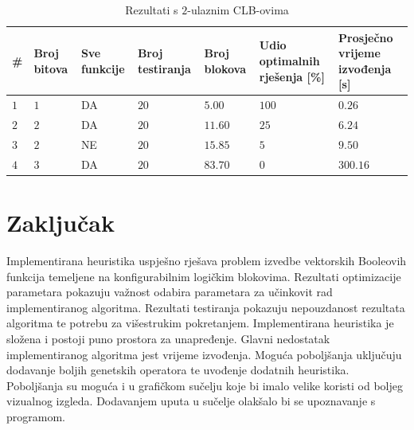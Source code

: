 \documentclass[times, utf8, diplomski]{fer}
\begin{document}
\begin{table}
	\centering
	\caption{Rezultati s $2$-ulaznim CLB-ovima}
	\label{tab:input-results}
	\begin{tabular}{
			|>{\centering\arraybackslash}m{4mm}
			|>{\centering\arraybackslash}m{18mm}
			|>{\centering\arraybackslash}m{18mm}
			|>{\centering\arraybackslash}m{18mm}
			|>{\centering\arraybackslash}m{18mm}
			|>{\centering\arraybackslash}m{20mm}
			|>{\centering\arraybackslash}m{20mm}|}
		\hline
		\textbf{\#}
		& \textbf{Broj \linebreak bitova}
		& \textbf{Sve \linebreak funkcije}
		& \textbf{Broj \linebreak testiranja}
		& \textbf{Broj \linebreak blokova}
		& \textbf{Udio \linebreak optimalnih \linebreak rješenja [\%]}
		& \textbf{Prosječno vrijeme izvođenja [s]} \\ \hline

		$1$		& $1$	& DA	& $20$		& $5.00$	& $100$		& $0.26$	\\ \hline
		$2$		& $2$	& DA	& $20$		& $11.60$	& $25$		& $6.24$	\\ \hline
		$3$		& $2$	& NE	& $20$		& $15.85$	& $5$		& $9.50$	\\ \hline
		$4$		& $3$	& DA	& $20$		& $83.70$	& $0$		& $300.16$	\\ \hline
		
	\end{tabular}
\end{table}


\chapter{Zaključak} \label{chapter:conclusion}

Implementirana heuristika uspješno rješava problem izvedbe vektorskih Booleovih funkcija temeljene na konfigurabilnim logičkim blokovima. Rezultati optimizacije parametara pokazuju važnost odabira parametara za učinkovit rad implementiranog algoritma. Rezultati testiranja pokazuju nepouzdanost rezultata algoritma te potrebu za višestrukim pokretanjem. Implementirana heuristika je složena i postoji puno prostora za unapređenje. Glavni nedostatak implementiranog algoritma jest vrijeme izvođenja. Moguća poboljšanja uključuju dodavanje boljih genetskih operatora te uvođenje dodatnih heuristika. Poboljšanja su moguća i u grafičkom sučelju koje bi imalo velike koristi od boljeg vizualnog izgleda. Dodavanjem uputa u sučelje olakšalo bi se upoznavanje s programom.
\end{document}
